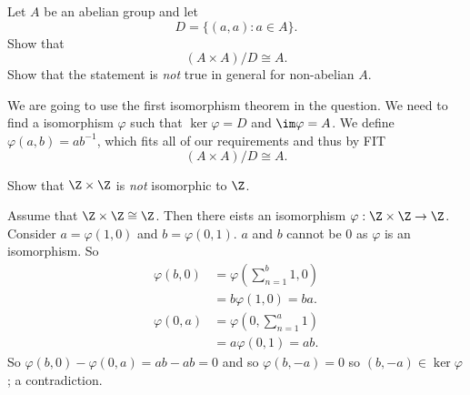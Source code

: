 
\setcounter{question}{27}
\question Let $A$ be an abelian group and let
\[
    D = \{(a,a): a \in A\}.
\]
Show that
\[
    (A\times A)/D \cong A.
\]
Show that the statement is \emph{not} true in general for non-abelian $A$.
\begin{solution}
    We are going to use the first isomorphism theorem in the question.
    We need to find a isomorphism $\varphi$ such that $\ker\varphi = D$ and
    $\im\varphi = A$.
    We define $\varphi(a,b) = ab^{-1}$, which fits all of our requirements and thus 
    by FIT
    \[
        (A\times A)/D \cong A.
    \]
\end{solution}

\setcounter{question}{26}
\question Show that $\Z \times \Z$ is \emph{not} isomorphic to $\Z$.
\begin{solution}
    Assume that $\Z \times \Z \cong \Z$.
    Then there eists an isomorphism $\varphi: \Z \times \Z \to \Z$.
    Consider $a = \varphi(1,0)$ and $b = \varphi(0,1)$.
    $a$ and $b$ cannot be $0$ as $\varphi$ is an isomorphism.
    So
    \begin{align*}
        \varphi(b,0) &= \varphi(\sum_{n=1}^b 1, 0) \\
                     &= b\varphi(1,0) = ba. \\
        \varphi(0,a) &= \varphi(0,\sum_{n=1}^a 1) \\
                     &= a\varphi(0,1) = ab.
    \end{align*}
    So $\varphi(b,0) - \varphi(0,a) = ab - ab = 0$
    and so $\varphi(b,-a) = 0$ so $(b,-a) \in \ker\varphi$; a contradiction.
\end{solution}

